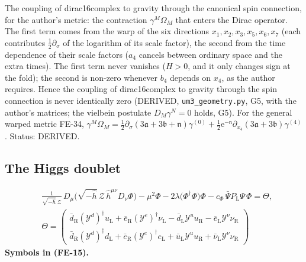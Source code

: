 \documentclass[
  10pt,
]{article}
\begin{document}
The coupling of dirac16complex to gravity through the canonical spin
connection, for the author's metric: the contraction
\(\gamma^M\Omega_M\) that enters the Dirac operator. The first term
comes from the warp of the six directions
\(x_1, x_2, x_3, x_5, x_6, x_7\) (each contributes
\(\frac12\partial_\sigma\) of the logarithm of its scale factor), the
second from the time dependence of their scale factors (\(a_4\) cancels
between ordinary space and the extra times). The first term never
vanishes (\(H > 0\), and it only changes sign at the fold); the second
is non-zero whenever \(b_4\) depends on \(x_4\), as the author requires.
Hence the coupling of dirac16complex to gravity through the spin
connection is never identically zero (DERIVED,
\texttt{um3\_geometry.py}, G5, with the author's matrices; the vielbein
postulate \(D_M\gamma^N = 0\) holds, G5). For the general warped metric
FE-34,
\(\gamma^M\Omega_M = \frac12\partial_\sigma(3\mathfrak{a} + 3\mathfrak{b} + \mathfrak{n})\gamma^{(0)} + \frac12\mathrm{e}^{-\mathfrak{n}}\partial_{x_4}(3\mathfrak{a} + 3\mathfrak{b})\gamma^{(4)}\).
Status: DERIVED.

\hypertarget{the-higgs-doublet}{%
\subsection{The Higgs doublet}\label{the-higgs-doublet}}

\[
\begin{aligned}
&\frac{1}{\sqrt{-\hat h}\,\mathcal{Z}}\,D_\mu\big(\sqrt{-\hat h}\,\mathcal{Z}\,\hat h^{\mu\nu}D_\nu\Phi\big) - \mu^2\Phi
 - 2\lambda\big(\Phi^\dagger\Phi\big)\Phi - c_\Phi\,\bar\Psi P_{\mathrm{L}}\Psi\,\Phi = \Theta,\\
&\Theta = \begin{pmatrix}\bar d_{\mathrm{R}}(\mathcal{Y}^{d})^\dagger u_{\mathrm{L}} + \bar e_{\mathrm{R}}(\mathcal{Y}^{e})^\dagger\nu_{\mathrm{L}}
 - \bar d_{\mathrm{L}}\mathcal{Y}^{u}u_{\mathrm{R}} - \bar e_{\mathrm{L}}\mathcal{Y}^{\nu}\nu_{\mathrm{R}}\\
 \bar d_{\mathrm{R}}(\mathcal{Y}^{d})^\dagger d_{\mathrm{L}} + \bar e_{\mathrm{R}}(\mathcal{Y}^{e})^\dagger e_{\mathrm{L}}
 + \bar u_{\mathrm{L}}\mathcal{Y}^{u}u_{\mathrm{R}} + \bar\nu_{\mathrm{L}}\mathcal{Y}^{\nu}\nu_{\mathrm{R}}\end{pmatrix}
\end{aligned} \tag{FE-15}
\] \textbf{Symbols in (FE-15).}
\end{document}
